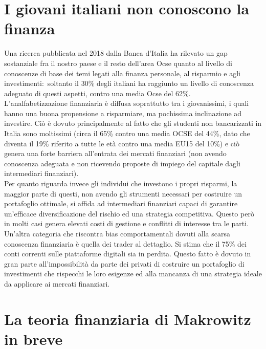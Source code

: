 \section{I giovani italiani non conoscono la finanza}
Una ricerca pubblicata nel 2018 dalla Banca d’Italia ha rilevato un gap sostanziale fra il nostro paese e il resto dell’area Ocse quanto al livello di conoscenze di base dei temi legati alla finanza personale, al risparmio e agli investimenti: soltanto il 30\% degli italiani ha raggiunto un livello di conoscenza adeguato di questi aspetti, contro una media Ocse del 62\%.\\
L’analfabetizzazione finanziaria è diffusa soprattutto tra i giovanissimi, i quali hanno una buona propensione a risparmiare, ma pochissima inclinazione ad investire. Ciò è dovuto principalmente al fatto che gli studenti non bancarizzati in Italia sono moltissimi (circa il 65\% contro una media OCSE del 44\%, dato che diventa il 19\% riferito a tutte le età contro una media EU15 del 10\%) e ciò genera una forte barriera all’entrata dei mercati finanziari (non avendo conoscenza adeguata e non ricevendo proposte di impiego del capitale dagli intermediari finanziari).\\
Per quanto riguarda invece gli individui che investono i propri risparmi, la maggior parte di questi, non avendo gli strumenti necessari per costruire un portafoglio ottimale, si affida ad intermediari finanziari capaci di garantire un’efficace diversificazione del rischio ed una strategia competitiva. Questo però in molti casi genera elevati costi di gestione e conflitti di interesse tra le parti.\\
Un’altra categoria che riscontra bias comportamentali dovuti alla scarsa conoscenza finanziaria è quella dei trader al dettaglio. Si stima che il 75\% dei conti correnti sulle piattaforme digitali sia in perdita. Questo fatto è dovuto in gran parte all’impossibilità da parte dei privati di costruire un portafoglio di investimenti che rispecchi le loro esigenze ed alla mancanza di una strategia ideale da applicare ai mercati finanziari.


\section{La teoria finanziaria di Makrowitz in breve}

